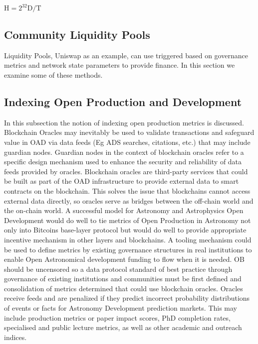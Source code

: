 \documentclass[final,5p,times,twocolumn,authoryear]{elsarticle}
\begin{document}
$\textrm{H} = 2^{32} \textrm{D} / \textrm{T}$\\

\subsection{Community Liquidity Pools}
Liquidity Pools, Uniswap as an example, can use triggered based on governance metrics and network state parameters to provide finance. In this section we examine some of these methods.


\subsection{Indexing Open Production and Development}

In this subsection the notion of indexing open production metrics is discussed.
Blockchain Oracles may inevitably be used to validate transactions and safeguard value in OAD via data feeds (Eg ADS searches, citations, etc.) that may include guardian nodes. Guardian nodes in the context of blockchain oracles refer to a specific design mechanism used to enhance the security and reliability of data feeds provided by oracles. Blockchain oracles are third-party services that could be built as part of the OAD infrastructure to provide external data to smart contracts on the blockchain. This solves the issue that blockchains cannot access external data directly, so oracles serve as bridges between the off-chain world and the on-chain world.
A successful model for Astronomy and Astrophysics Open Development would do well to tie metrics of Open Production in Astronomy not only into Bitcoins base-layer protocol but would do well to provide appropriate incentive mechanism in other layers and blockchains. A tooling mechanism could be used to define metrics by existing governance structures in real institutions to enable Open Astronomical development funding to flow when it is needed. OB should be uncensored so a data protocol standard of best practice through governance of existing institutions and communities must be first defined and consolidation of metrics determined that could use blockchain oracles. Oracles receive feeds and are penalized if they predict incorrect probability distributions of events or facts for Astronomy Development prediction markets. This may include production metrics or paper impact scores, PhD completion rates, specialised and public lecture metrics, as well as other academic and outreach indices.  
\end{document}
